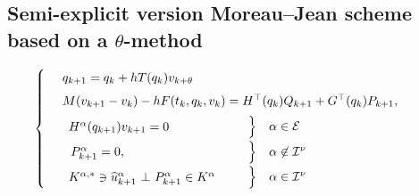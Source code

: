 \subsection{Semi-explicit version Moreau--Jean scheme based on a  $\theta$-method}

\begin{equation}
    \label{eq:Moreau--Jean-explicit}
    \begin{cases}
      ~~\begin{array}{l}
        q_{k+1} = q_{k} + h T(q_{k}) v_{k+\theta} \quad \\[1ex]
        M(v_{k+1}-v_k) - h  F(t_{k}, q_{k},v_{k}) =  H^\top(q_{k}) Q_{k+1}+  G^\top(q_{k}) P_{k+1},\quad\,\\[1ex]
      \end{array}\\
      ~~\begin{array}{lcl}
        \begin{array}{l}
          H^\alpha(q_{k+1}) v_{k+1}  =  0\\
        \end{array} & \left. \begin{array}{l}
          \vphantom{H^\alpha(q_{k+1}) v_{k+1}  =  0}\\[1ex]
        \end{array}\right\}    &\alpha \in \mathcal E  \\[1ex]
      ~~P_{k+1}^\alpha= 0, &
      \left. \begin{array}{l}
          \vphantom{P_{k+1}^\alpha= 0,  \delta^\alpha_{k+1}=0}\\[1ex]
        \end{array}\right\}   & \alpha \not\in \mathcal I^\nu \\[1ex]
      \begin{array}{l}
          {K}^{\alpha,*} \ni \widehat u_{k+1}^\alpha~ \bot~ P_{k+1}^\alpha \in {K}^\alpha \\
      \end{array} &
      \left.\begin{array}{l}
          \vphantom{{K}^{\alpha,*} \ni \widehat u_{k+1}^\alpha~ \bot~ P_{k+1}^\alpha \in {K}^\alpha} \\
        \end{array}\right\}
      &\alpha \in \mathcal I^\nu\\
  \end{array}
\end{cases}
\end{equation}

